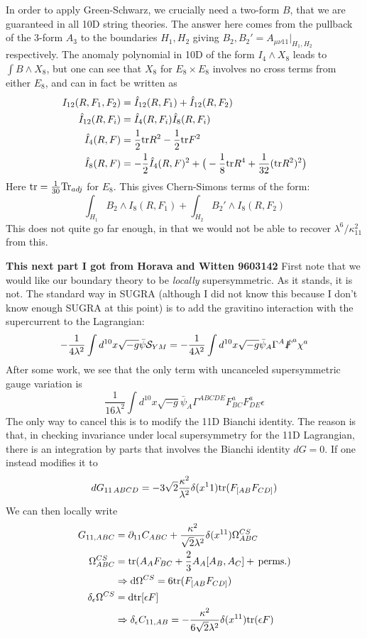 \documentclass[11pt, class=article, crop=false]{standalone}
\begin{document}
\begin{enumerate}
	 In order to apply Green-Schwarz, we crucially need a two-form $B$, that we are guaranteed in all 10D string theories. The answer here comes from the pullback of the 3-form $A_3$ to the boundaries $H_1, H_2$ giving $B_2, B_2' = A_{\mu \nu 11}\big|_{H_1, H_2}$ respectively. 	The anomaly polynomial in 10D of the form $I_4 \wedge X_8$ leads to $\int B \wedge X_8$, but one can see that $X_8$ for $E_8 \times E_8$ involves no cross terms from either $E_8$, and can in fact be written as 
	 \begin{align}
	 	I_{12}(R, F_1, F_2)&= \hat I_{12}(R, F_1) + \hat I_{12}(R, F_2)\\
		\hat I_{12}(R, F_i) &= \hat I_4(R, F_i) \hat I_8(R, F_i)\\
		\hat I_4(R, F) &= \frac12 \mathrm{tr} R^2 - \frac12 \mathrm{tr} F^2\\
		\hat I_8(R, F) &= - \frac12 \hat I_4 (R, F)^2 + \big(-\frac18 \mathrm{tr} R^4 + \frac{1}{32} (\mathrm{tr} R^2)^2 \big) \label{eq:I8}
	 \end{align}
	 Here $\mathrm{tr} = \frac{1}{30} \mathrm{Tr}_{adj}$ for $E_8$.
	 This gives Chern-Simons terms of the form:
	 \[
	 	\int_{H_1} B_2 \wedge I_8(R, F_1) + \int_{H_2} B_2' \wedge I_8(R, F_2)
	 \]
	 This does not quite go far enough, in that we would not be able to recover $\lambda^6/\kappa_{11}^2$ from this. 
	 
	\textbf{This next part I got from Horava and Witten 9603142}
	 First note that we would like our boundary theory to be \emph{locally} supersymmetric. As it stands, it is not. The standard way in SUGRA (although I did not know this because I don't know enough SUGRA at this point) is to add the gravitino interaction with the supercurrent to the Lagrangian: 
	 \[
		-\frac{1}{4 \lambda^2} \int d^{10} x \sqrt{-g} \bar \psi \mathcal S_{YM} = -\frac{1}{4 \lambda^2} \int d^{10} x \sqrt{-g} \bar \psi_A \Gamma^A \slashed{F}^a \chi^a
	 \]
	 After some work, we see that the only term with uncanceled supersymmetric gauge variation is
	 \[
	 	\frac{1}{16 \lambda^2} \int d^{10} x\sqrt{-g} \bar \psi_A  \Gamma^{ABCDE} F_{BC}^a F_{DE}^a \epsilon
	 \]
	 The only way to cancel this is to modify the 11D Bianchi identity. The reason is that, in checking invariance under local supersymmetry for the 11D Lagrangian, there is an integration by parts that involves the Bianchi identity $dG = 0$. If one instead modifies it to
	 \[
	 	dG_{11 \, A B C D} = - 3 \sqrt2 \frac{\kappa^2}{\lambda^2} \delta(x^11) \mathrm{tr} (F_{[AB} F_{CD]})
	 \]
	 We can then locally write 
	 \begin{align}
	 	G_{11, ABC} &= \partial_{11} C_{ABC} + \frac{\kappa^2}{\sqrt2 \lambda^2} \delta(x^{11}) \Omega_{ABC}^{CS} \label{eq:anom1}\\
		 \Omega_{ABC}^{CS} &= \mathrm{tr}(A_A F_{BC} + \frac23 A_A [A_B, A_C] + \,\mathrm{perms.}) \label{eq:anom2} \\
		 &\Rightarrow \mathrm{d} \Omega^{CS} = 6 \mathrm{tr} (F_{[AB} F_{CD]}) \label{eq:anom3}\\
		 \delta_{\epsilon} \Omega^{CS} &= \mathrm{d} \mathrm{tr} [\epsilon F] \label{eq:anom4}\\
		&\Rightarrow \delta_{\epsilon} C_{11, AB} = - \frac{\kappa^2}{6\sqrt2 \lambda^2} \delta(x^{11}) \mathrm{tr} (\epsilon F) \label{eq:anom5}
	 \end{align}
	 

\end{enumerate}
\end{document}
